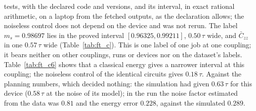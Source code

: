 \documentclass[aps,prx,onecolumn,10pt,nofootinbib,longbibliography,floatfix]{revtex4-2}
\theoremstyle{remark}
\newcommand{\ms}{m_s}
\newcommand{\Czz}{\bar C_{zz}}
\begin{document}
tests, with the declared code and versions, and its interval, in exact rational arithmetic, on a laptop from the
fetched outputs, as the declaration allows; the noiseless control does not depend on the device and was not rerun. The label $\ms=0.98697$ lies in the proved interval $[0.96325,0.99211]$, $0.50\,\tau$ %
wide, and $\Czz$ in one $0.57\,\tau$ wide (Table~\ref{tab:ft_c}). This is one label of one job at one coupling; it bears %
neither on other couplings, runs or devices nor on the dataset's labels. Table~\ref{tab:ft_c6} shows that a classical
energy gives a narrower interval at this coupling; the noiseless control of the identical circuits gives $0.18\,\tau$. %
Against the planning numbers, which decided nothing: the simulation had given $0.63\,\tau$ for this device ($0.58\,\tau$ %
at the noise of its model); in the run the noise factor estimated from the data was $0.81$ and the energy error %
$0.228$, against the simulated $0.289$. %
\needspace{120pt}%
\def\SMcap{Expected intervals of $m_s$ at $J_z=6.0$ with $18$ certificates (floats of existing states, planning numbers, not exact proofs). The device run's proved interval is in Table~\ref{tab:ft_c}.}\def\SMlab{tab:ft_c6} %

\end{document}
